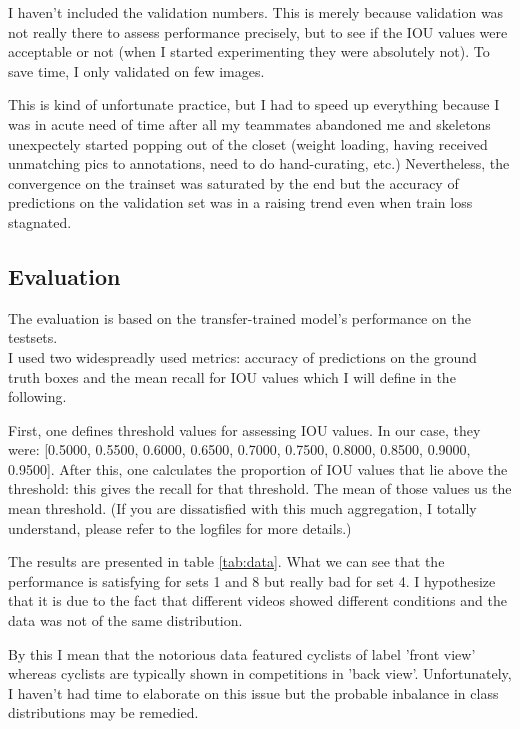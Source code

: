 \documentclass{article}
\begin{document}
I haven't included the validation numbers. This is merely because validation was not really there to assess performance precisely, but to see if the IOU values were acceptable or not (when I started experimenting they were absolutely not). To save time, I only validated on few images. 

This is kind of unfortunate practice, but I had to speed up everything because I was in acute need of time after all my teammates abandoned me and skeletons unexpectely started popping out of the closet (weight loading, having received unmatching pics to annotations, need to do hand-curating, etc.) Nevertheless, the convergence on the trainset was saturated by the end but the accuracy of predictions on the validation set was in a raising trend even when train loss stagnated.

\subsection{Evaluation}

The evaluation is based on the transfer-trained model's performance on the testsets.\\

I used two widespreadly used metrics: accuracy of predictions on the ground truth boxes and the mean recall for IOU values which I will define in the following. 

First, one defines threshold values for assessing IOU values. In our case, they were:  
[0.5000, 0.5500, 0.6000, 0.6500, 0.7000, 0.7500, 0.8000, 0.8500, 0.9000,
        0.9500]. After this, one calculates the proportion of IOU values that lie above the threshold: this gives the recall for that threshold. The mean of those values us the mean threshold. (If you are dissatisfied with this much aggregation, I totally understand, please refer to the logfiles for more details.)
        
The results are presented in table \ref{tab:data}. What we can see that the performance is satisfying for sets 1 and 8 but really bad for set 4. I hypothesize that it is due to the fact that different videos showed different conditions and the data was not of the same distribution. 

By this I mean that the notorious data featured cyclists of label 'front view' whereas cyclists are typically shown in competitions in 'back view'. Unfortunately, I haven't had time to elaborate on this issue but the probable inbalance in class distributions may be remedied.
\end{document}
